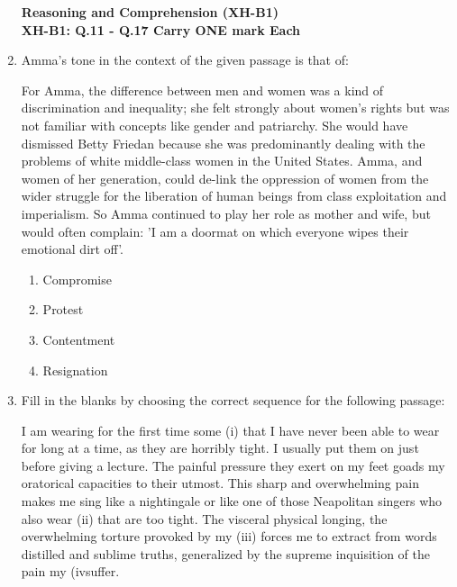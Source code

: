 \documentclass[journal,12pt,onecolumn]{exam}
\theoremstyle{remark}
\begin{document}
\begin{enumerate}
\newpage

\textbf{Reasoning and Comprehension (XH-B1)}\\

\textbf{XH-B1: Q.11 - Q.17 Carry ONE mark Each }\\

 \item Amma's tone in the context of the given passage is that of:

    \medskip
     
    For Amma, the difference between men and women was a kind of discrimination and inequality; she felt strongly about women's rights but was not familiar with concepts like gender and patriarchy. She would have dismissed Betty Friedan because she was predominantly dealing with the problems of white middle-class women in the United States. Amma, and women of her generation, could de-link the oppression of women from the wider struggle for the liberation of human beings from class exploitation and imperialism. So Amma continued to play her role as mother and wife, but would often complain: 'I am a doormat on which everyone wipes their emotional dirt off'.

    \begin{enumerate}[label=\alph*)]
        \item Compromise
        \item Protest
        \item Contentment
        \item Resignation
    \end{enumerate}

\item Fill in the blanks by choosing the correct sequence for the following passage:

    \medskip

    
    I am wearing for the first time some (i)\underline{\hspace{1cm}} that I have never been able to wear for long at a time, as they are horribly tight. I usually put them on just before giving a lecture. The painful pressure they exert on my feet goads my oratorical capacities to their utmost. This sharp and overwhelming pain makes me sing like a nightingale or like one of those Neapolitan singers who also wear (ii)\underline{\hspace{1cm}} that are too tight. The visceral physical longing, the overwhelming torture provoked by my (iii)\underline{\hspace{1cm}} forces me to extract from words distilled and sublime truths, generalized by the supreme inquisition of the pain my (iv\underline{\hspace{1cm}}suffer.


\end{enumerate}
\end{document}
